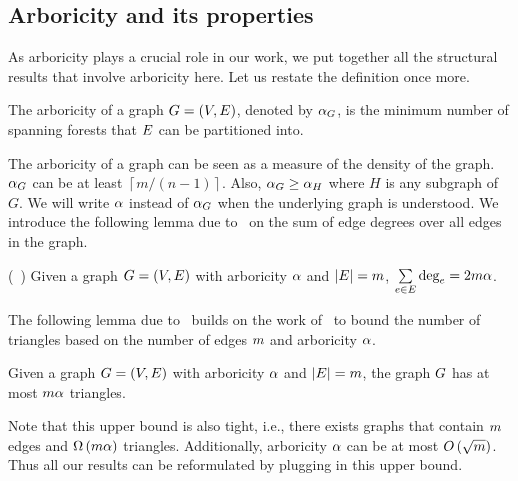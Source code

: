 \subsection{Arboricity and its properties}
\label{ssec:arbor-prop}
As arboricity plays a crucial role in our work, we put together all the structural results that involve arboricity here. Let us restate the definition once more. 
\begin{definition}
   The arboricity of a graph $G = (V,E)$, denoted by $\alpha_{G}$, is the minimum number of spanning forests that $E$ can be partitioned into.
   \label{def:arboricity}
\end{definition}
The arboricity of a graph can be seen as a measure of the density of the graph. $\alpha_{G}$ can be at least $\left\lceil m/(n-1)\right\rceil$. Also, $\alpha_{G} \geq \alpha_{H}$ where $H$ is any subgraph of $G$. We will write $\alpha$ instead of $\alpha_{G}$ when the underlying graph is understood. We introduce the following lemma due to~\citep{DBLP:journals/siamcomp/ChibaN85} on the sum of edge degrees over all  edges in the graph.
\begin{lemma}(~\citep{DBLP:journals/siamcomp/ChibaN85})
\label{Lemma: deg(e) sum is m * arboricity}
     Given a graph $G = (V,E)$ with arboricity $\alpha$ and $\left|{E}\right| = m$,  $\sum\limits_{e \in E} \mbox{deg}_{e} = 2m\alpha$.
\end{lemma}

The following lemma due to~\citep{DBLP:conf/soda/EdenRS20} builds on the work of~\citep{DBLP:journals/siamcomp/ChibaN85} to bound the number of triangles based on the number of edges $m$ and arboricity $\alpha$. 
\begin{lemma}
\label{lemma: arboricity triangle bound}
    Given a graph $G = (V,E)$ with arboricity $\alpha$ and $\left|{E}\right| = m$, the graph $G$ has at most $m\alpha$ triangles.
\end{lemma}
Note that this upper bound is also tight, i.e., there exists graphs that contain $m$ edges and $\Omega\left({{m\alpha}}\right)$ triangles. Additionally, arboricity $\alpha$ can be at most $O\left({{\sqrt{m}}}\right)$. Thus all our results can be reformulated by plugging in this upper bound. 


